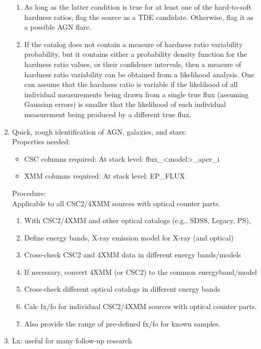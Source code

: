 \begin{enumerate}
\begin{enumerate}
  \item As long as the latter condition is true for at least one of the hard-to-soft hardness ratios, flag the source as a TDE candidate. Otherwise, flag it as a possible AGN flare.
  \item If the catalog does not contain a measure of hardness ratio variability probability, but it contains either a probability density function for the hardness ratio values, or their confidence intervals, then a measure of hardness ratio variability can be obtained from a likelihood analysis. One can assume that the hardness ratio is variable if the likelihood of all individual measurements being drawn from a single true flux (assuming Gaussian errors) is smaller that the likelihood of each individual measurement being produced by a different true flux.
  \end{enumerate}
\item Quick, rough identification of AGN, galaxies, and stars: \\
  Properties needed:
  \begin{itemize}
  \item CSC columns required: At stack level: flux\_<model>\_aper\_i
  \item XMM columns required: At stack level: EP\_FLUX
  \end{itemize}
  Procedure: \\
  Applicable to all CSC2/4XMM sources with optical counter parts.
  \begin{enumerate}
  \item With CSC2/4XMM and other optical catalogs (e.g., SDSS, Legacy, PS),
  \item Define energy bands, X-ray emission model for X-ray (and optical)
  \item Cross-check CSC2 and 4XMM data in different energy bands/models
  \item If necessary, convert 4XMM (or CSC2) to the common energyband/model
  \item Cross-check different optical catalogs in different energy bands
  \item Calc fx/fo for individual CSC2/4XMM sources with optical counter parts.
  \item Also provide the range of pre-defined fx/fo for known samples.
  \end{enumerate}
\item Lx: useful for many follow-up research \\

\end{enumerate}
